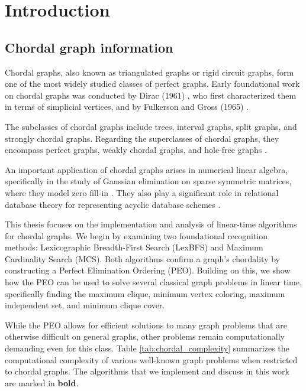 \chapter{Introduction}

\section{Chordal graph information}

Chordal graphs, also known as triangulated graphs or rigid circuit graphs, form one of the most widely studied classes of perfect graphs. Early foundational work on chordal graphs was conducted by Dirac (1961) \cite{Dirac1961}, who first characterized them in terms of simplicial vertices, and by Fulkerson and Gross (1965) \cite{FulkersonGross1965}. 

The subclasses of chordal graphs include trees, interval graphs, split graphs, and strongly chordal graphs. Regarding the superclasses of chordal graphs, they encompass perfect graphs, weakly chordal graphs, and hole-free graphs \cite{Brandstadt1999}. 

An important application of chordal graphs arises in numerical linear algebra, specifically in the study of Gaussian elimination on sparse symmetric matrices, where they model zero fill-in \cite{RoseTarjanLueker1976}. They also play a significant role in relational database theory for representing acyclic database schemes \cite{TarjanYannakakis1984}.

This thesis focuses on the implementation and analysis of linear-time algorithms for chordal graphs. We begin by examining two foundational recognition methods: Lexicographic Breadth-First Search (LexBFS) and Maximum Cardinality Search (MCS). Both algorithms confirm a graph's chordality by constructing a Perfect Elimination Ordering (PEO). Building on this, we show how the PEO can be used to solve several classical graph problems in linear time, specifically finding the maximum clique, minimum vertex coloring, maximum independent set, and minimum clique cover. 

While the PEO allows for efficient solutions to many graph problems that are otherwise difficult on general graphs, other problems remain computationally demanding even for this class. Table \ref{tab:chordal_complexity} summarizes the computational complexity of various well-known graph problems when restricted to chordal graphs. The algorithms that we implement and discuss in this work are marked in \textbf{bold}.

